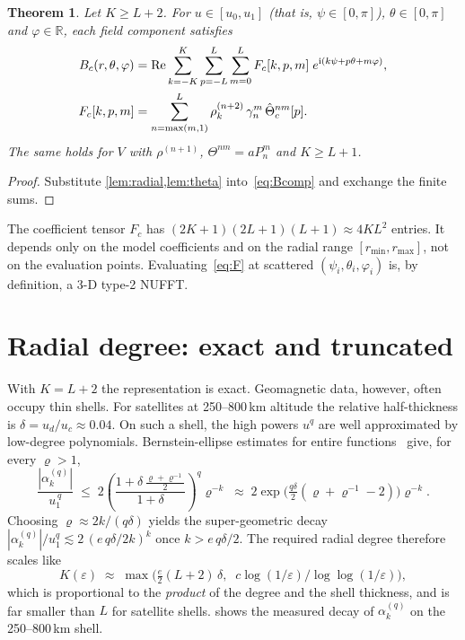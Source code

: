 \documentclass[11pt,a4paper]{article}
\newtheorem{theorem}{Theorem}
\theoremstyle{remark}
\newcommand{\R}{\mathbb{R}}
\newcommand{\eps}{\varepsilon}
\newcommand{\Th}{\Theta}
\renewcommand{\Re}{\operatorname{Re}}
\begin{document}
\begin{theorem}\label{thm:main}
Let $K\ge L+2$. For $u\in[u_0,u_1]$ (that is, $\psi\in[0,\pi]$), $\theta\in[0,\pi]$ and
$\varphi\in\R$, each field component satisfies
\begin{align}\label{eq:F}
B_c(r,\theta,\varphi)&=\Re\sum_{k=-K}^{K}\sum_{p=-L}^{L}\sum_{m=0}^{L}
F_c[k,p,m]\;e^{\mathrm i(k\psi+p\theta+m\varphi)},\\
F_c[k,p,m]&=\sum_{n=\max(m,1)}^{L}\rho_k^{(n+2)}\,\gamma_n^m\,\hat\Th_c^{nm}[p].\notag
\end{align}
The same holds for $V$ with $\rho^{(n+1)}$, $\Th^{nm}=aP_n^m$ and $K\ge L+1$.
\end{theorem}
\begin{proof}
Substitute \cref{lem:radial,lem:theta} into~\eqref{eq:Bcomp} and exchange the finite sums.
\end{proof}

The coefficient tensor $F_c$ has $(2K+1)(2L+1)(L+1)\approx4KL^2$ entries. It depends only on
the model coefficients and on the radial range $[r_{\min},r_{\max}]$, not on the evaluation points.
Evaluating~\eqref{eq:F} at scattered $(\psi_i,\theta_i,\varphi_i)$ is, by definition, a 3-D
type-2 NUFFT.

\section{Radial degree: exact and truncated}\label{sec:radial}

With $K=L+2$ the representation is exact. Geomagnetic data, however, often occupy thin shells.
For satellites at 250--800\,km altitude the relative half-thickness is
$\delta=u_d/u_c\approx0.04$. On such a shell, the high powers $u^{q}$ are well approximated by
low-degree polynomials. Bernstein-ellipse estimates for entire functions~\cite{trefethen2013} give,
for every $\varrho>1$,
\begin{equation}\label{eq:bern}
\frac{|\alpha_k^{(q)}|}{u_1^{\,q}}\;\le\;2\left(\frac{1+\delta\,\frac{\varrho+\varrho^{-1}}2}{1+\delta}\right)^{q}\varrho^{-k}
\;\approx\;2\exp\!\Big(\tfrac{q\delta}{2}(\varrho+\varrho^{-1}-2)\Big)\varrho^{-k}.
\end{equation}
Choosing $\varrho\approx 2k/(q\delta)$ yields the super-geometric decay
$|\alpha_k^{(q)}|/u_1^q\lesssim 2\,(e\,q\delta/2k)^{k}$ once $k>e\,q\delta/2$. The required radial degree
therefore scales like
\begin{equation}
K(\eps)\;\approx\;\max\!\big(\tfrac{e}{2}(L+2)\,\delta,\;\;c\log(1/\eps)/\log\log(1/\eps)\big),
\end{equation}
which is proportional to the \emph{product} of the degree and the shell thickness, and is far
smaller than $L$ for satellite shells.  shows the measured decay of
$\alpha_k^{(q)}$ on the 250--800\,km shell.
\end{document}
